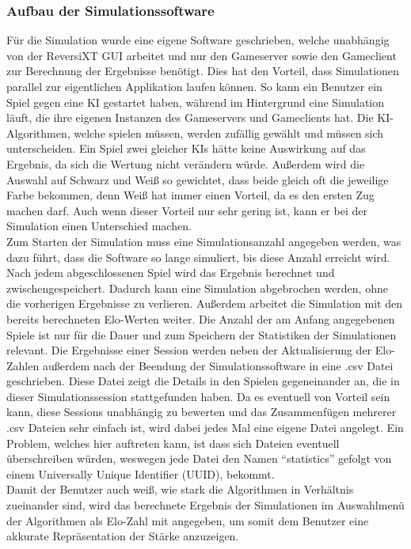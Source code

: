 \documentclass[12pt,a4paper,bibliography=totocnumbered,listof=totocnumbered]{article}
\begin{document}
\subsubsection{Aufbau der Simulationssoftware}
Für die Simulation wurde eine eigene Software geschrieben, welche unabhängig von der ReversiXT GUI arbeitet und nur den Gameserver 
sowie den Gameclient zur Berechnung der Ergebnisse benötigt. Dies hat den Vorteil, dass Simulationen parallel zur eigentlichen Applikation laufen können.
So kann ein Benutzer ein Spiel gegen eine KI gestartet haben, während im Hintergrund eine Simulation läuft, die ihre eigenen Instanzen des 
Gameservers und Gameclients hat. 
Die KI-Algorithmen, welche spielen müssen, werden zufällig gewählt und müssen sich unterscheiden. Ein Spiel zwei gleicher KIs hätte keine Auswirkung auf das 
Ergebnis, da sich die Wertung nicht verändern würde. Außerdem wird die Auswahl auf Schwarz und Weiß so gewichtet, dass beide gleich oft die jeweilige Farbe bekommen, 
denn Weiß hat immer einen Vorteil, da es den ersten Zug machen darf. Auch wenn dieser 
Vorteil nur sehr gering ist, kann er bei der Simulation einen Unterschied machen.
\\
Zum Starten der Simulation muss eine Simulationsanzahl angegeben werden, was dazu führt, dass die Software so lange simuliert, bis diese Anzahl erreicht wird.
Nach jedem abgeschlossenen Spiel wird das Ergebnis berechnet und zwischengespeichert. Dadurch kann eine Simulation abgebrochen werden, ohne die vorherigen 
Ergebnisse zu verlieren. Außerdem arbeitet die Simulation mit den bereits berechneten Elo-Werten weiter. Die Anzahl der am Anfang angegebenen 
Spiele ist nur für die Dauer und zum Speichern der Statistiken der Simulationen relevant. 
Die Ergebnisse einer Session werden neben der Aktualisierung der Elo-Zahlen außerdem nach der Beendung der Simulationssoftware in eine .csv Datei 
geschrieben. Diese Datei zeigt die Details in den Spielen gegeneinander an, die in dieser Simulationssession stattgefunden haben.
Da es eventuell von Vorteil sein kann, diese Sessions unabhängig zu bewerten und das Zusammenfügen mehrerer .csv Dateien sehr einfach ist, 
wird dabei jedes Mal eine eigene Datei angelegt. Ein Problem, welches hier auftreten kann, ist dass sich Dateien eventuell überschreiben würden, weswegen 
jede Datei den Namen ``statistics'' gefolgt von einem Universally Unique Identifier (UUID), bekommt.
\\
Damit der Benutzer auch weiß, wie stark die Algorithmen in Verhältnis zueinander sind, wird das berechnete Ergebnis der Simulationen im Auswahlmenü der 
Algorithmen als Elo-Zahl mit angegeben, um somit dem Benutzer eine akkurate Repräsentation der Stärke anzuzeigen.
\end{document}
